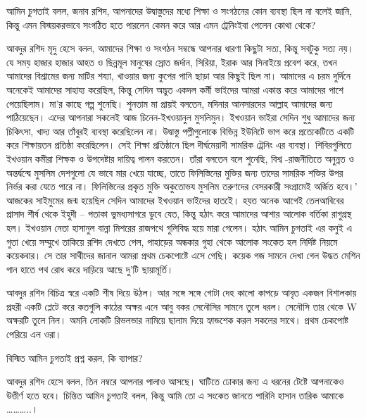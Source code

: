 \documentclass[
]{book}
\begin{document}
আমিন চুগতাই বলল, জনাব রশিদ, আপনাদের উদ্বাস্তুদের মধ্যে শিক্ষা ও সংগঠনের কোন ব্যবস্থা ছিল না বলেই জানি, কিন্তু এমন বিস্ময়করভাবে সংগঠিত হতে পারলেন কেমন করে আর এমন ট্রেনিংইবা পেলেন কোথা থেকে?

আবদুর রশিদ মৃদু হেসে বলল, আমাদের শিক্ষা ও সংগঠন সম্বন্ধে আপনার ধারণা কিছুটা সত্য, কিন্তু সবটুকু সত্য নয়। যে সময় হাজার হাজার আহত ও ছিন্নমূল মানুষের স্রোত জর্দান, সিরিয়া, ইরাক আর সিনাইয়ে প্রবেশ করে, তখন আমাদের বিশ্রামের জন্য মাটির শয্যা, খাওয়ার জন্য কুপের পানি ছাড়া আর কিছুই ছিল না। আমাদের এ চরম দুর্দিনে অনেকেই আমাদের সাহায্য করেছিল, কিন্তু সেদিন অদ্ভুত একদল কর্মী ভাইদের আমরা একান্ত করে আমাদের পাশে পেয়েছিলাম। মা'র কাছে গল্প শুনেছি। শুনতাম মা প্রায়ই বলতেন, মদিনার আনসারদের আল্লাহ আমাদের জন্য পাঠিয়েছেন। এদের আপনারা সকলেই আজ চিনেন-ইখওয়ানুল মুসলিমুন। ইখওয়ান ভাইরা সেদিন শুধু আমাদের জন্য চিকিৎসা, খাদ্য আর তাঁবুরই ব্যবস্থা করেছিলেন না। উদ্বাস্তু পল্লীগুলোকে বিভিন্ন ইউনিটে ভাগ করে প্রত্যেকটিতে একটি করে শিক্ষায়তন প্রতিষ্ঠা করেছিলেন। সেই শিক্ষা প্রতিষ্ঠানে ছিল দীর্ঘমেয়াদী সামরিক ট্রেনিং এর ব্যবস্থা। শিবিরগুলিতে ইখওয়ান কমীরা শিক্ষক ও উপদেষ্টার দায়িত্ব পালন করতেন। তাঁরা বলতেন বলে শুনেছি, বিশ্ব -রাজনীতিতে অনুন্নত ও অন্তর্দ্বন্দ্বে মুসলিম দেশগুলো যে ভাবে মার খেয়ে যাচ্ছে, তাতে ফিলিস্তিনের মুক্তির জন্য তাদের সামরিক শক্তির উপর নির্ভর করা যেতে পারে না। ফিলিস্তিনের প্রকৃত মুক্তি অকুতোভয মুসলিম তরুণদের বেসরকারী সংগ্রামেই অর্জিত হবে।' আজকের সাইমুমের জন্ম হয়েছিল সেদিন আমাদের ইখওয়ান ভাইদের হাতইে। হয়ত অনেক আগেই তেলআবিবের প্রাসাদ শীর্ষ থেকে ইহুদী -- পতাকা ভুমধ্যসাগরে ডুবে যেত, কিন্তু হঠাৎ করে আমাদের আশার আলোক বর্তিকা রাগুগ্রস্থ হল। ইখওয়ান নেতা হাসানুল বান্না মিশরের রাজপথে গুলিবিদ্ধ হয়ে মারা গেলেন। হঠাৎ আমিন চুগতাই এর কনুই এ গুতা খেয়ে সম্মুখে তাকিয়ে রশিদ দেখতে পেল, পাহাড়ের অন্ধকার গুহা থেকে আলোক সংকেত হল নির্দিষ্ট নিয়মে কয়েকবার। সে তার সাথীদের জানাল আমরা প্রথম চেকপোষ্টে এসে গেছি। কয়েক গজ সামনে দেখা গেল উদ্ধত মেশিন গান হাতে পথ রোধ করে দাড়িয়ে আছে দু'টি ছায়ামূর্তি।

আবদুর রশিদ বিচিত্র স্বরে একটি শীষ দিয়ে উঠল। আর সঙ্গে সঙ্গে গোটা দেহ কালো কাপড়ে আবৃত একজন বিশালকায় প্রহরী একটি প্লেটে করে কতগুলি কাঠের অক্ষর এনে আবু বকর সেনৌসির সামনে তুলে ধরল। সেনৌসি তার থেকে W অক্ষরটি তুলে নিল। অমনি লোকটি রিভলভার নামিয়ে ছালাম দিয়ে হ্যান্ডশেক করল সকলের সাথে। প্রথম চেকপোষ্ট পেরিয়ে এল ওরা।

বিস্মিত আমিন চুগতাই প্রশ্ন করল, কি ব্যাপার?

আবদুর রশিদ হেসে বলল, তিন নম্বরে আপনার পালাও আসছে। ঘাটিতে ঢোকার জন্য এ ধরনের টেষ্টে আপনাকেও উত্তীর্ণ হতে হবে। চিন্তিত আমিন চুগতাই বলল, কিন্তু আমি তো এ সংকেত জানতে পারিনি হাসান তারিক আমাকে \ldots\ldots\ldots..।
\end{document}
